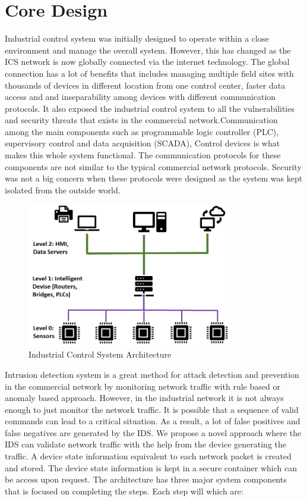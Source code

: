 \documentclass[conference]{IEEEtran}
\begin{document}
\section{Core Design}
Industrial control system was initially designed to operate within a close environment and manage the overall system. However, this has changed as the ICS network is now globally connected via the internet technology. The global connection has a lot of benefits that includes managing multiple field sites with thousands of devices in different location from one control center, faster data access and and inseparability among devices with different communication protocols. It also exposed the industrial control system to all the vulnerabilities and security threats that exists in the commercial network.Communication among the main components such as programmable logic controller (PLC), supervisory control and data acquisition (SCADA), Control devices is what makes this whole system functional. The communication protocols for these components are not similar to the typical commercial network protocols. Security was not a big concern when these protocols were designed as the system was kept isolated from the outside world. 
\begin{figure}[htbp]
\centering
\centerline{\includegraphics [width=9cm] {ICS-Architecture-RelOK.png}}
\caption{Industrial Control System Architecture}
\label{fig}
\end{figure}
Intrusion detection system is a great method for attack detection and prevention in the commercial network by monitoring network traffic with rule based or anomaly based approach. However, in the industrial network it is not always enough to just monitor the network traffic. It is possible that a sequence of valid commands can lead to a critical situation. As a result, a lot of false positives and false negatives are generated by the IDS. We propose a novel approach where the IDS can validate network traffic with the help from the device generating the traffic. A device state information equivalent to each network packet is created and stored. The device state information is kept in a secure container which can be access upon request. The architecture has three major system components that is focused on completing the steps. Each step will which are:
\end{document}
